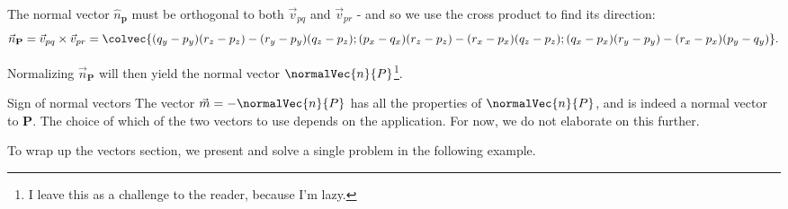 The normal vector $\hat{n}_{\bm{p}}$ must be orthogonal to both $\vec{v}_{pq}$ and $\vec{v}_{pr}$ - and so we use the cross product to find its direction:
\begin{equation}
	\vec{n}_{\mathbf{P}} = \vec{v}_{pq} \times \vec{v}_{pr} = \colvec{(q_{y}-p_{y})(r_{z}-p_{z}) - (r_{y}-p_{y})(q_{z}-p_{z});(p_{x}-q_{x})(r_{z}-p_{z}) - (r_{x}-p_{x})(q_{z}-p_{z});(q_{x}-p_{x})(r_{y}-p_{y}) - (r_{x}-p_{x})(p_{y}-q_{y})}.
	\label{eq:normal to plane}
\end{equation}

Normalizing $\vec{n}_{\mathbf{P}}$ will then yield the normal vector $\normalVec{n}{P}$\footnote{I leave this as a challenge to the reader, because I'm lazy.}.

\begin{note}{Sign of normal vectors}{}
	The vector $\vec{m}=-\normalVec{n}{P}$ has all the properties of $\normalVec{n}{P}$, and is indeed a normal vector to $\mathbf{P}$. The choice of which of the two vectors to use depends on the application. For now, we do not elaborate on this further.
\end{note}

To wrap up the vectors section, we present and solve a single problem in the following example.

